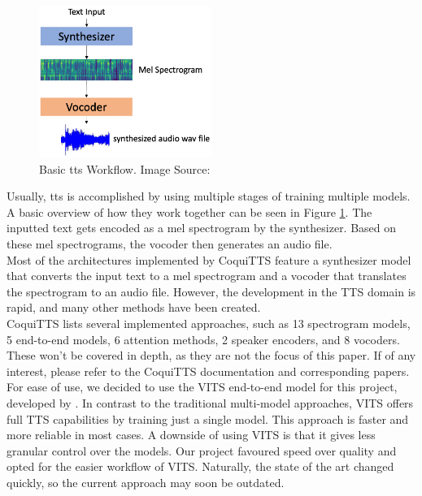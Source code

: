 \documentclass[
  a4paper,  %
  twoside,  %
  bibliography=totoc,
  headsepline,
  cleardoublepage=empty,
  parskip=half,
  draft=false
]{scrbook}
\begin{document}
\begin{figure}[h]
  \centering
  \includegraphics[width=0.5\textwidth]{./graphics/tts/tts-workflow.png}
  \caption{Basic \gls{tts} Workflow. Image Source: \cite{jemineRealTimeVoiceCloning2019}}
  \label{fig:tts-explainer}
\end{figure}

Usually, \gls{tts} is accomplished by using multiple stages of training multiple models. A basic overview of how they work together can be seen in Figure \ref{fig:tts-explainer}. The inputted text gets encoded as a mel spectrogram by the synthesizer. Based on these mel spectrograms, the vocoder then generates an audio file. \\
Most of the architectures implemented by CoquiTTS feature a synthesizer model that converts the input text to a mel spectrogram and a vocoder that translates the spectrogram to an audio file. However, the development in the TTS domain is rapid, and many other methods have been created. \\
CoquiTTS lists several implemented approaches, such as 13 spectrogram models, 5 end-to-end models, 6 attention methods, 2 speaker encoders, and 8 vocoders. These won't be covered in depth, as they are not the focus of this paper. If of any interest, please refer to the CoquiTTS documentation and corresponding papers.\\
For ease of use, we decided to use the VITS end-to-end model for this project, developed by \citet{kimConditionalVariationalAutoencoder2021}. In contrast to the traditional multi-model approaches, VITS offers full TTS capabilities by training just a single model. This approach is faster and more reliable in most cases. A downside of using VITS is that it gives less granular control over the models. Our project favoured speed over quality and opted for the easier workflow of VITS. Naturally, the state of the art changed quickly, so the current approach may soon be outdated.
\end{document}

